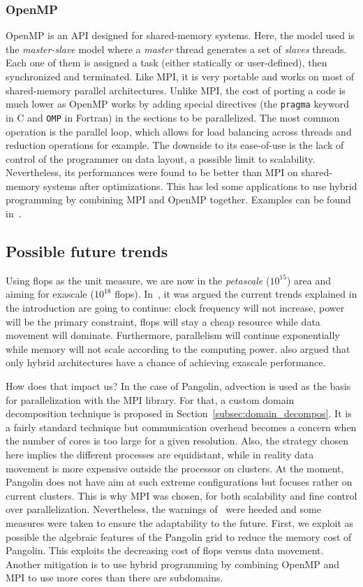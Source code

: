 \subsubsection{OpenMP}
\gls{OpenMP} is an \gls{API} designed for shared-memory systems. Here, the model
used is the \textit{master-slave} model where a \textit{master} thread generates a set
of \textit{slaves} threads. Each one of them is assigned a task (either
statically or user-defined), then synchronized and terminated.  Like MPI, it is
very portable and works on most of shared-memory parallel architectures. Unlike
MPI, the cost of porting a code is much lower as OpenMP works by adding special
directives (the \texttt{pragma} keyword in C and \texttt{OMP} in Fortran) in the
sections to be parallelized. The most common operation is the parallel loop,
which allows for load balancing across threads and reduction operations for
example.
The downside to its ease-of-use is the lack of control of the programmer on data
layout, a possible limit to scalability. Nevertheless, its performances were
found to be better than MPI on shared-memory systems after optimizations. This
has led some applications to use hybrid programming by combining MPI
and OpenMP together. Examples can be found
in~\cite{Chorley2010,Jin2011,Guo2014}.

\subsection{Possible future trends}
Using flops as the unit measure, we are now in the \textit{petascale}
($10^{15}$) area and aiming for exascale ($10^{18}$ flops).
In~\cite{Perfect2004}, it was argued the current trends explained in the
introduction are going to continue: clock frequency will not increase, power
will be the primary constraint, flops will stay a cheap resource while data
movement will dominate. Furthermore, parallelism will
continue exponentially while memory will not scale according to the computing power.
\cite{Perfect2004} also argued that only hybrid architectures have a chance of
achieving exascale performance.

How does that impact us? In the case of Pangolin, advection is used as the
basis for parallelization with the MPI library. For that, a custom domain decomposition
technique is proposed in Section~\ref{subsec:domain_decompos}. It is a fairly
standard technique but communication \gls{overhead} becomes a concern when the
number of cores is too large for a given resolution. Also, the strategy chosen
here implies the different processes are equidistant, while in reality data
movement is more expensive outside the processor on clusters.  At the moment,
Pangolin does not have aim at such extreme configurations but focuses rather on
current clusters. This is why MPI was chosen, for both scalability and fine
control over parallelization.  Nevertheless, the warnings of~\cite{Perfect2004}
were heeded and some measures were taken to ensure the adaptability to the
future. First, we exploit as possible the algebraic features of the Pangolin
grid to reduce the memory cost of Pangolin.  This exploits the decreasing cost
of flops versus data movement. Another mitigation is to use hybrid programming
by combining OpenMP and MPI to use more cores than there are subdomains.

